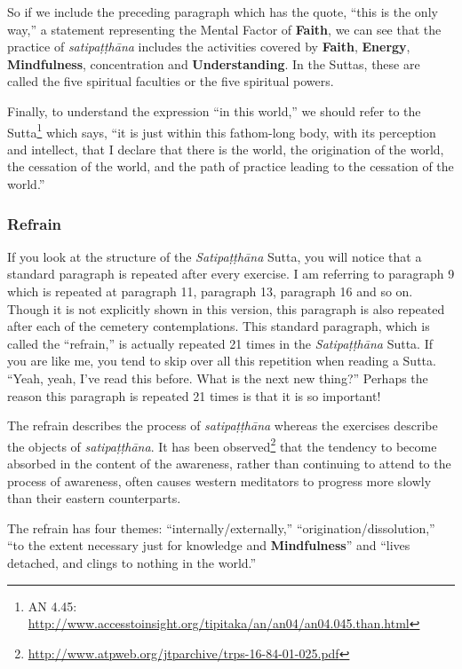 So if we include the preceding paragraph which has the quote, “this is the only way,” a statement representing the Mental Factor of \textbf{Faith}, we can see that the \color{blue} practice\color{black} of \textit{satipaṭṭhāna} includes the activities covered by \textbf{Faith}, \textbf{Energy}, \textbf{Mindfulness}, concentration and \textbf{Understanding}. In the Suttas, these are called the five spiritual faculties or the five spiritual powers.

Finally, to understand the expression “in this world,” we should refer to the Sutta\footnote{AN 4.45: \url{http://www.accesstoinsight.org/tipitaka/an/an04/an04.045.than.html}} which says, “it is just within this fathom-long body, with its perception and intellect, that I declare that there is the world, the origination of the world, the cessation of the world, and the path of \color{blue} practice\color{black} leading to the cessation of the world.”

\subsubsection*{Refrain}

If you look at the structure of the \textit{Satipaṭṭhāna} Sutta, you will notice that a standard paragraph is repeated after every exercise. I am referring to paragraph 9 which is repeated at paragraph 11, paragraph 13, paragraph 16 and so on. Though it is not explicitly shown in this version, this paragraph is also repeated after each of the cemetery contemplations. This standard paragraph, which is called the “refrain,” is actually repeated 21 times in the \textit{Satipaṭṭhāna} Sutta. If you are like me, you tend to skip over all this repetition when reading a Sutta. “Yeah, yeah, I’ve read this before. What is the next new thing?” Perhaps the reason this paragraph is repeated 21 times is that it is so important!

The refrain describes the process of \textit{satipaṭṭhāna} whereas the exercises describe the objects of \textit{satipaṭṭhāna}. It has been observed\footnote{\url{http://www.atpweb.org/jtparchive/trps-16-84-01-025.pdf}} that the tendency to become absorbed in the content of the awareness, rather than continuing to attend to the process of awareness, often causes western meditators to progress more slowly than their eastern counterparts.

The refrain has four themes: “internally/externally,” “origination/dissolution,” “to the extent necessary just for knowledge and \textbf{Mindfulness}” and “lives detached, and clings to nothing in the world.”

